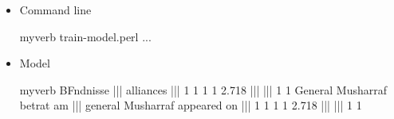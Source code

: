 \documentclass[landscape]{uedslides2C}
\begin{document}

% 
% 

%
%
%
%

\vspace{20mm}
\begin{itemize}
\item Command line
\begin{center}
\begin{SaveVerbatim}{myverb}
train-model.perl ...
\end{SaveVerbatim}
\colorbox{gray}{}
\end{center}

\item Model
\begin{center}
\footnotesize
\begin{SaveVerbatim}{myverb}
B\9Fndnisse ||| alliances ||| 1 1 1 1 2.718 ||| ||| 1 1
General Musharraf betrat am ||| general Musharraf appeared on ||| 1 1 1 1 2.718 ||| ||| 1 1

\end{SaveVerbatim}
\colorbox{gray}{}
\end{center}
\end{itemize}

\end{document}
